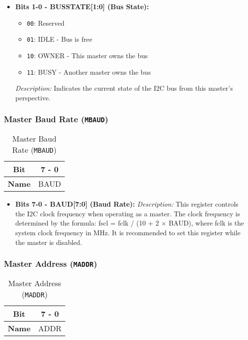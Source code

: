 \begin{itemize}
    \item \textbf{Bits 1-0 - BUSSTATE[1:0] (Bus State):} 
    \begin{itemize}
        \item \texttt{00}: Reserved
        \item \texttt{01}: IDLE - Bus is free
        \item \texttt{10}: OWNER - This master owns the bus
        \item \texttt{11}: BUSY - Another master owns the bus
    \end{itemize}
    \textit{Description:} Indicates the current state of the I2C bus from this master's perspective.
\end{itemize}

\subsubsection{Master Baud Rate (\texttt{MBAUD})}
\label{sec:mbaud}

\begin{table}[H]
    \centering
    \caption{Master Baud Rate (\texttt{MBAUD})}
    \begin{tabular}{@{}cc@{}}
        \toprule
        \textbf{Bit} & 7 - 0 \\ \midrule
        \textbf{Name} & BAUD \\ \bottomrule
    \end{tabular}
    \label{tab:mbaud}
\end{table}

\begin{itemize}
    \item \textbf{Bits 7-0 - BAUD[7:0] (Baud Rate):} 
    \textit{Description:} This register controls the I2C clock frequency when operating as a master. The clock frequency is determined by the formula: fscl = fclk / (10 + 2 × BAUD), where fclk is the system clock frequency in MHz. It is recommended to set this register while the master is disabled.
\end{itemize}

\subsubsection{Master Address (\texttt{MADDR})}
\label{sec:maddr}

\begin{table}[H]
  \centering
  \caption{Master Address (\texttt{MADDR})}
  \begin{tabular}{@{}cc@{}}
      \toprule
      \textbf{Bit} & 7 - 0 \\ \midrule
      \textbf{Name} & ADDR \\ \bottomrule
  \end{tabular}
  \label{tab:maddr}
\end{table}


